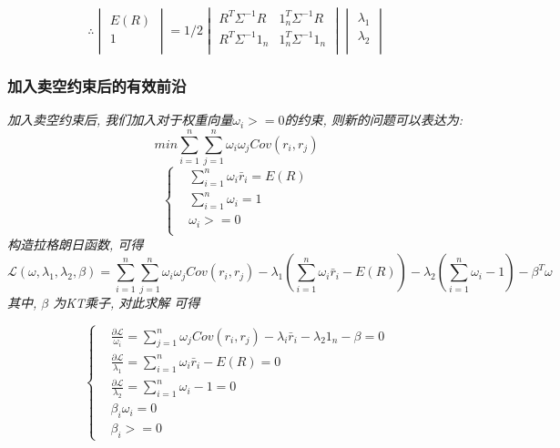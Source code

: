 \documentclass{scrartcl}
\numberwithin{equation}{section}   %
\begin{document}
\[\therefore
    \begin{vmatrix}
        E(R) \\ 1\\
    \end{vmatrix} = 1/2 \begin{vmatrix}
        R^T \Sigma^{-1} R & 1_n^T \Sigma^{-1} R \\ R^T \Sigma^{-1} 1_n & 1_n^T \Sigma^{-1} 1_n\\
    \end{vmatrix} \begin{vmatrix}
        \lambda_1 \\ \lambda_2 \\
    \end{vmatrix}
\]


\subsubsection{加入卖空约束后的有效前沿}
\textsl{加入卖空约束后, 我们加入对于权重向量$\omega_i >=0$的约束, 则新的问题可以表达为:}
$$ min \sum_{i=1}^n \sum_{j=1}^n \omega_i \omega_j Cov(r_i, r_j)$$
\begin{equation}
    \left\{
    \begin{array}{lr}
         & \sum_{i=1}^n \omega_i \bar{r}_i = E(R) \\
         & \sum_{i=1}^n \omega_i =1               \\
         & \omega_i  >=0                          \\
    \end{array}
    \right.
\end{equation}
\textsl{
    构造拉格朗日函数, 可得
}
$$\mathcal{L} (\omega, \lambda_1, \lambda_2, \beta) = \sum_{i=1}^n \sum_{j=1}^n \omega_i \omega_j Cov(r_i, r_j) - \lambda_1(\sum_{i=1}^n \omega_i \bar{r}_i - E(R)) - \lambda_2 (\sum_{i=1}^n \omega_i -1) - \beta^T \omega$$
\textsl{其中, $\beta$ 为KT乘子, 对此求解 可得}

\begin{equation}
    \left\{
    \begin{array}{lr}
         & \frac{\partial \mathcal{L}}{\omega_i} = \sum_{j=1}^n \omega_j Cov(r_i, r_j) - \lambda_i \bar{r}_i - \lambda_2  1_n - \beta =0 \\ & \frac{\partial \mathcal{L}}{\lambda_1} = \sum_{i=1}^n \omega_i \bar{r}_i - E(R) =0 \\ & \frac{\partial \mathcal{L}}{\lambda_2} = \sum_{i=1}^n \omega_i -1 =0 \\ & \beta_i \omega_i =0 \\ & \beta_i >=0
    \end{array}
    \right.
\end{equation}
\newpage
\end{document}

